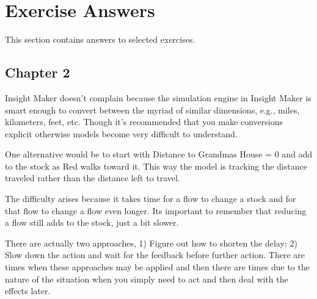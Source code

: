 \documentclass[]{memoir}
\begin{document}
\chapter{Exercise Answers}

This section contains answers to selected exercises.

\section{Chapter 2}


Insight Maker doesn't complain because the simulation engine in Insight
Maker is smart enough to convert between the myriad of similar
dimensions, e.g., miles, kilometers, feet, etc. Though it's recommended
that you make conversions explicit otherwise models become very
difficult to understand.


One alternative would be to start with Distance to Grandmas House = 0
and add to the stock as Red walks toward it. This way the model is
tracking the distance traveled rather than the distance left to travel.


The difficulty arises because it takes time for a flow to change a stock
and for that flow to change a flow even longer. Its important to
remember that reducing a flow still adds to the stock, just a bit
slower.


There are actually two approaches, 1) Figure out how to shorten the
delay; 2) Slow down the action and wait for the feedback before further
action. There are times when these approaches may be applied and then
there are times due to the nature of the situation when you simply need
to act and then deal with the effects later.
\end{document}
